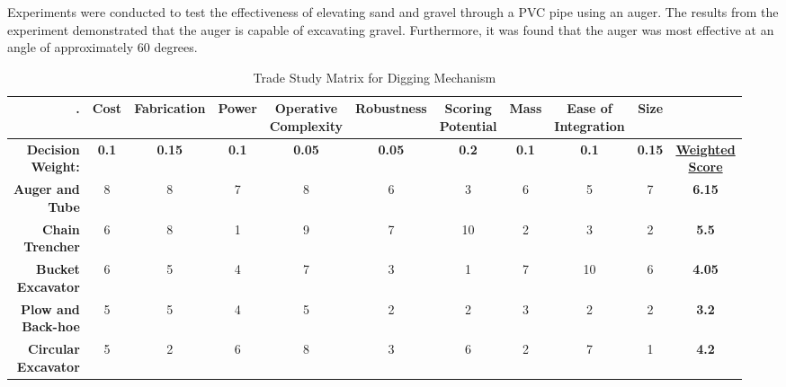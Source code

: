 \documentclass[class=article, crop=false]{standalone}
\begin{document}
Experiments were conducted to test the effectiveness of elevating sand and gravel through a PVC pipe using an auger. The results from the experiment demonstrated that the auger is capable of excavating gravel. Furthermore, it was found that the auger was most effective at an angle of approximately 60 degrees. 


\FloatBarrier
	\begin{table}[h]
	\scriptsize
	\centering
	\begin{tabular}{ | r | c | c | c | c | c | c | c | c | c | c |}
 	\hline
 		\rowcolor[gray]{0.8}
 		\textbf{.} &\textbf{Cost} &\textbf{Fabrication} &\textbf{Power} &\makecell{\textbf{Operative} \\ \textbf{Complexity}} &\textbf{Robustness} &\makecell{\textbf{Scoring} \\ \textbf{Potential}} &\textbf{Mass} & \makecell{\textbf{Ease of} \\ \textbf{Integration}} &\textbf{Size} &  \\ 
 		\hline
		\makecell{\textbf{Decision} \\ \textbf{Weight:}}& \textbf{0.1} &\textbf{0.15} &\textbf{0.1} &\textbf{0.05} &\textbf{0.05} &\textbf{0.2} &
		\textbf{0.1} &\textbf{0.1}  &\textbf{0.15} &\makecell{\textbf{\underline{Weighted}} \\ \textbf{\underline{Score}}}  \\ 
 		\hline\hline
 		\makecell{\textbf{Auger and} \\ \textbf{Tube}}    & 8 & 8 & 7 & 8 & 6 & 3 & 6 & 5 & 7 & \textbf{6.15} \\ 
 		\hline
 		\makecell{\textbf{Chain} \\ \textbf{Trencher}}    & 6 & 8 & 1 & 9 & 7 & 10 & 2 & 3 & 2 & \textbf{5.5} \\
 		\hline
 		\makecell{\textbf{Bucket} \\ \textbf{Excavator}}  & 6 & 5 & 4 & 7 & 3 & 1 & 7 & 10 & 6 & \textbf{4.05} \\
 		\hline
 		\makecell{\textbf{Plow and} \\ \textbf{Back-hoe}} & 5 & 5 & 4 & 5 & 2 & 2 & 3 & 2 & 2 & \textbf{3.2} \\
 		\hline
 		\makecell{\textbf{Circular} \\ \textbf{Excavator}}& 5 & 2 & 6 & 8 & 3 & 6 & 2 & 7 & 1 & \textbf{4.2} \\ 
 		\hline
	\end{tabular}
	\caption{Trade Study Matrix for Digging Mechanism}
		\label{table:dig-trade-study}
	\end{table}
	\FloatBarrier
	
\end{document}
